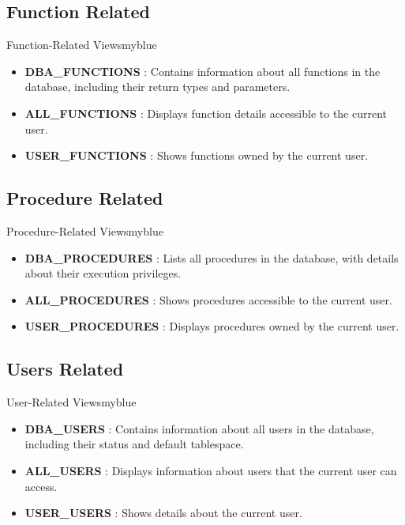 \vspace{0.25cm}
\subsection{Function Related}
\begin{prettyBox}{Function-Related Views}{myblue}
\begin{itemize}
    \item \textbf{DBA\_FUNCTIONS} : Contains information about all functions in the database, including their return types and parameters.
    \item \textbf{ALL\_FUNCTIONS} : Displays function details accessible to the current user.
    \item \textbf{USER\_FUNCTIONS} : Shows functions owned by the current user.
\end{itemize}
\end{prettyBox}

\vspace{0.25cm}
\subsection{Procedure Related}
\begin{prettyBox}{Procedure-Related Views}{myblue}
\begin{itemize}
    \item \textbf{DBA\_PROCEDURES} : Lists all procedures in the database, with details about their execution privileges.
    \item \textbf{ALL\_PROCEDURES} : Shows procedures accessible to the current user.
    \item \textbf{USER\_PROCEDURES} : Displays procedures owned by the current user.
\end{itemize}
\end{prettyBox}

\vspace{0.25cm}
\subsection{Users Related}
\begin{prettyBox}{User-Related Views}{myblue}
\begin{itemize}
    \item \textbf{DBA\_USERS} : Contains information about all users in the database, including their status and default tablespace.
    \item \textbf{ALL\_USERS} : Displays information about users that the current user can access.
    \item \textbf{USER\_USERS} : Shows details about the current user.
\end{itemize}
\end{prettyBox}

